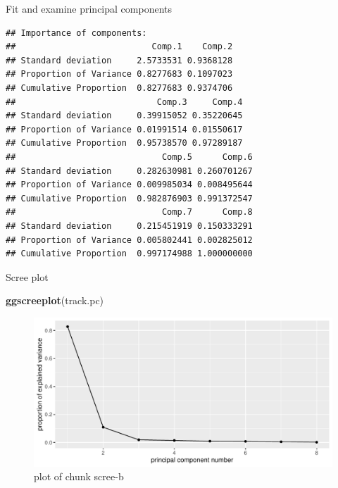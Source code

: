 \documentclass[ignorenonframetext,]{beamer}
\newenvironment{Shaded}{\begin{snugshade}}{\end{snugshade}}
\newcommand{\DataTypeTok}[1]{\textcolor[rgb]{0.13,0.29,0.53}{#1}}
\newcommand{\KeywordTok}[1]{\textcolor[rgb]{0.13,0.29,0.53}{\textbf{#1}}}
\newcommand{\NormalTok}[1]{#1}
\newcommand{\OperatorTok}[1]{\textcolor[rgb]{0.81,0.36,0.00}{\textbf{#1}}}
\newcommand{\StringTok}[1]{\textcolor[rgb]{0.31,0.60,0.02}{#1}}
\begin{document}
\begin{frame}[fragile]{Fit and examine principal components}
\protect\hypertarget{fit-and-examine-principal-components}{}

\footnotesize

\begin{Shaded}
\end{Shaded}

\begin{verbatim}
## Importance of components:
##                           Comp.1    Comp.2
## Standard deviation     2.5733531 0.9368128
## Proportion of Variance 0.8277683 0.1097023
## Cumulative Proportion  0.8277683 0.9374706
##                            Comp.3     Comp.4
## Standard deviation     0.39915052 0.35220645
## Proportion of Variance 0.01991514 0.01550617
## Cumulative Proportion  0.95738570 0.97289187
##                             Comp.5      Comp.6
## Standard deviation     0.282630981 0.260701267
## Proportion of Variance 0.009985034 0.008495644
## Cumulative Proportion  0.982876903 0.991372547
##                             Comp.7      Comp.8
## Standard deviation     0.215451919 0.150333291
## Proportion of Variance 0.005802441 0.002825012
## Cumulative Proportion  0.997174988 1.000000000
\end{verbatim}

\normalsize

\end{frame}

\begin{frame}[fragile]{Scree plot}
\protect\hypertarget{scree-plot-2}{}

\begin{Shaded}
\begin{Highlighting}[]
\KeywordTok{ggscreeplot}\NormalTok{(track.pc)}
\end{Highlighting}
\end{Shaded}

\begin{figure}
\centering
\includegraphics{figure/scree-b-1.pdf}
\caption{plot of chunk scree-b}
\end{figure}

\end{frame}
\end{document}
